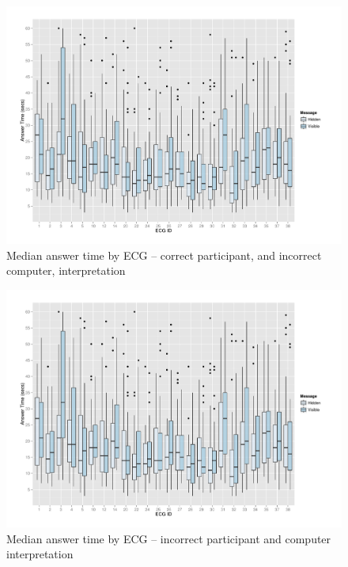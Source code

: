 \begin{figure}[htbp]
\centerline{\includegraphics[page=3,keepaspectratio=false,width=0.8\paperwidth,height=0.45\paperwidth]{AnsTimeVsECG.pdf}}
\caption{Median answer time by ECG -- correct participant, and incorrect computer, interpretation}
\label{boxplot3}
\end{figure}

\begin{figure}[htbp]
\centerline{\includegraphics[page=4,keepaspectratio=false,width=0.8\paperwidth,height=0.45\paperwidth]{AnsTimeVsECG.pdf}}
\caption{Median answer time by ECG -- incorrect participant and computer interpretation}
\label{boxplot4}
\end{figure}